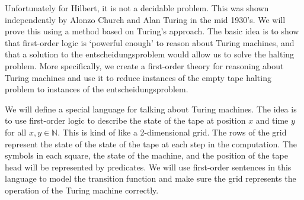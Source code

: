 \documentclass{article}
\theoremstyle{plain}
\theoremstyle{definition}
\begin{document}
Unfortunately for Hilbert, it is not a decidable problem. This was shown independently by Alonzo Church and Alan Turing in the mid 1930's. We will prove this using a method based on Turing's approach. The basic idea is to show that first-order logic is `powerful enough' to reason about Turing machines, and that a solution to the entscheidungsproblem would allow us to solve the halting problem. More specifically, we create a first-order theory for reasoning about Turing machines and use it to reduce instances of the empty tape halting problem to instances of the entscheidungsproblem.

We will define a special language for talking about Turing machines. The idea is to use first-order logic to describe the state of the tape at position $x$ and time $y$ for all $x,y\in\mathbb{N}$. This is kind of like a 2-dimensional grid. The rows of the grid represent the state of the state of the tape at each step in the computation. The symbols in each square, the state of the machine, and the position of the tape head will be represented by predicates. We will use first-order sentences in this language to model the transition function and make sure the grid represents the operation of the Turing machine correctly.
\end{document}

